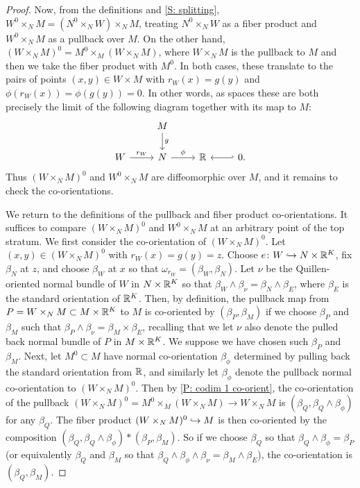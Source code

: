 \begin{proof}
	Now, from the definitions and \cref{S: splitting}, $W^0 \times_N M = (N^0 \times_N W) \times_N M$, treating $N^0 \times_N W$ as a fiber product and $W^0 \times_N M$ as a pullback over $M$.
	On the other hand, $(W \times_N  M)^0 = M^0 \times_M (W \times_N M)$, where $W \times_N M$ is the pullback to $M$ and then we take the fiber product with $M^0$.
	In both cases, these translate to the pairs of points $(x,y) \in W \times M$ with $r_W(x) = g(y)$ and $\phi(r_W(x)) = \phi(g(y)) = 0$.
	In other words, as spaces these are both precisely the limit of the following diagram together with its map to $M$:
	\[
	\begin{tikzcd}
		& M \arrow[d,"g"] & \\
		W \arrow[r, "r_W"] & N \arrow[r, "\phi"] & \R & \arrow[l,hook'] 0.
	\end{tikzcd}
	\]
	Thus $(W \times_N M)^0$ and $W^0 \times_N M$ are diffeomorphic over $M$, and it remains to check the co-orientations.

	We return to the definitions of the pullback and fiber product co-orientations.
	It suffices to compare $(W \times_N M)^0$ and $W^0 \times_N M$ at an arbitrary point of the top stratum.
	We first consider the co-orientation of $(W \times_N M)^0$.
	Let $(x,y) \in (W \times_N M)^0$ with $r_W(x) = g(y) = z$.
	Choose $e \colon W \hookrightarrow N \times \mathbb{R}^K$, fix $\beta_N$ at $z$, and choose $\beta_W$ at $x$ so that $\omega_{r_W} = (\beta_W,\beta_N)$.
	Let $\nu$ be the Quillen-oriented normal bundle of $W$ in $N \times \mathbb{R}^K$ so that $\beta_W \wedge \beta_\nu = \beta_N \wedge \beta_E$, where $\beta_E$ is the standard orientation of $\mathbb{R}^K$.
	Then, by definition, the pullback map from $P = W \times_N M \subset M \times \mathbb{R}^K$ to $M$ is co-oriented by $(\beta_P,\beta_M)$ if we choose $\beta_P$ and $\beta_M$ such that $\beta_P \wedge \beta_\nu = \beta_M \times \beta_E$, recalling that we let $\nu$ also denote the pulled back normal bundle of $P$ in $M \times \mathbb{R}^K$.
	We suppose we have chosen such $\beta_P$ and $\beta_M$.
	Next, let $M^0 \subset M$ have normal co-orientation $\beta_\phi$ determined by pulling back the standard orientation from $\mathbb{R}$, and similarly let $\beta_\phi$ denote the pullback normal co-orientation to $(W \times_N M)^0$.
	Then by \cref{P: codim 1 co-orient}, the co-orientation of the pullback $(W \times_N M)^0 = M^0 \times_M (W \times_N M) \to W \times_N M$ is $(\beta_Q,\beta_Q \wedge \beta_\phi)$ for any $\beta_Q$.
	The fiber product $(W \times_N M)^0 \hookrightarrow M$ is then co-oriented by the composition $(\beta_Q,\beta_Q \wedge \beta_\phi)*(\beta_P,\beta_M)$.
	So if we choose $\beta_Q$ so that $\beta_Q \wedge \beta_\phi = \beta_P$ (or equivalently $\beta_Q$ and $\beta_M$ so that $\beta_Q \wedge \beta_\phi \wedge \beta_\nu = \beta_M \wedge \beta_E$), the co-orientation is $(\beta_Q,\beta_M)$.


\end{proof}
